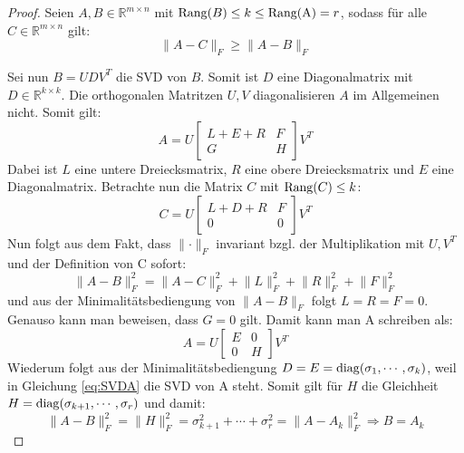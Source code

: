 \documentclass{article}
\newcommand{\R}[0]{\mathbb{R}}
\begin{document}
\begin{proof} \cite[S. 74]{strang2019linear}
    Seien $A,B \in \R^{m \times n}$ mit ${\rm Rang}(B) \leq k \leq {\rm Rang(A)} = r$, sodass für alle $C \in \R^{m \times n}$ gilt: 
    \begin{equation*}
        \lVert A - C \rVert_F \geq \lVert A - B \rVert_F
    \end{equation*}

    Sei nun $B=U D V^T$ die SVD von $B$. Somit ist $D$ eine Diagonalmatrix mit $D \in \R^{k\times k}$. 
    Die orthogonalen Matritzen $U,V$ diagonalisieren $A$ im Allgemeinen nicht. Somit gilt:
    \begin{equation*}
        A = U \begin{bmatrix}
            L+E+R & F\\
            G & H
        \end{bmatrix} V^T
    \end{equation*} 
    Dabei ist $L$ eine untere Dreiecksmatrix, $R$ eine obere Dreiecksmatrix und $E$ eine Diagonalmatrix. Betrachte nun die Matrix $C$ mit ${\rm Rang}(C) \leq k$:
    \begin{equation*}
        C = U \begin{bmatrix}
            L+D+R & F \\
            0 & 0
        \end{bmatrix} V^T
    \end{equation*}
    Nun folgt aus dem Fakt, dass $\lVert \cdot \rVert_F$ invariant bzgl. der Multiplikation mit $U, V^T$ und der Definition von C sofort:
    \begin{equation*}
        \lVert A - B \rVert_F^2 = \lVert A-C \rVert_F^2 + \lVert L \rVert_F^2 + \lVert R \rVert_F^2 + \lVert F \rVert_F^2
    \end{equation*}
    und aus der Minimalitätsbediengung von $\lVert A - B \rVert_F$ folgt $L = R = F = 0$. Genauso kann man beweisen, dass $G = 0$ gilt. Damit kann man A schreiben als:
    \begin{equation}
        A = U \begin{bmatrix}
            E & 0 \\
            0 & H
        \end{bmatrix} V^T \label{eq:SVDA}
    \end{equation}
    Wiederum folgt aus der Minimalitätsbediengung $D = E = {\rm diag}(\sigma_1, \cdots, \sigma_k)$, weil in Gleichung \ref{eq:SVDA} die SVD von A steht.
    Somit gilt für $H$ die Gleichheit $H = {\rm diag}(\sigma_{k+1}, \cdots, \sigma_r)$ und damit:
    \begin{equation*}
        \lVert A - B \rVert_F^2 = \lVert H \rVert_F^2 = \sigma_{k+1}^2 + \cdots + \sigma_{r}^2 = \lVert A - A_k \rVert_F^2 \Rightarrow B = A_k 
    \end{equation*}

\end{proof}
\end{document}
